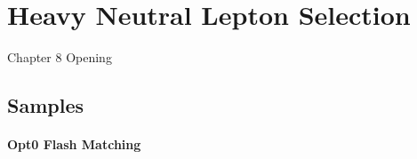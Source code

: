 \chapter{Heavy Neutral Lepton Selection}
\label{ChapterSelection}

\ifpdf
    \graphicspath{{Chapter8/Figs/Raster/}{Chapter8/Figs/PDF/}{Chapter8/Figs/}}
\else
    \graphicspath{{Chapter8/Figs/Vector/}{Chapter8/Figs/}}
\fi


Chapter 8 Opening
\newpage

\section{Samples}




\subsubsection{Opt0 Flash Matching}


